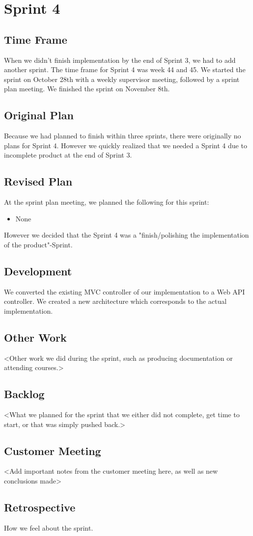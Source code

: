 \section{Sprint 4}

\subsection{Time Frame}
When we didn't finish implementation by the end of Sprint 3, we had to add another sprint. The time frame for Sprint 4 was week 44 and 45. We started the sprint on October 28th with a weekly supervisor meeting, followed by a sprint plan meeting. We finished the sprint on November 8th.

\subsection{Original Plan}
Because we had planned to finish within three sprints, there were originally no plans for Sprint 4. However we quickly realized that we needed a Sprint 4 due to incomplete product at the end of Sprint 3.

\subsection{Revised Plan}
At the sprint plan meeting, we planned the following for this sprint:
\begin{itemize}
	\item None
\end{itemize}
However we decided that the Sprint 4 was a "finish/polishing the implementation of the product"-Sprint.

\subsection{Development}
We converted the existing MVC controller of our implementation to a Web API controller.
We created a new architecture which corresponds to the actual implementation.

\subsection{Other Work}
<Other work we did during the sprint, such as producing documentation or attending courses.>

\subsection{Backlog}
<What we planned for the sprint that we either did not complete, get time to start, or that was simply pushed back.>

\subsection{Customer Meeting}
<Add important notes from the customer meeting here, as well as new conclusions made>

\subsection{Retrospective}
How we feel about the sprint.